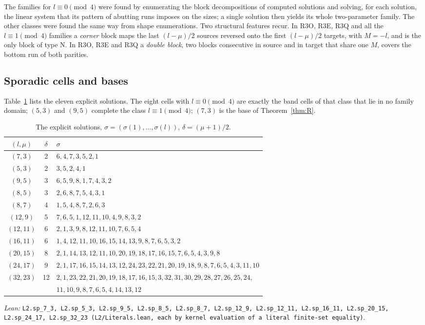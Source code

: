 \documentclass[11pt]{amsart}
\theoremstyle{plain}
\theoremstyle{definition}
\theoremstyle{remark}
\newcommand{\lean}[1]{\par\smallskip
  {\small\raggedright\noindent\textit{Lean:} \texttt{#1}.\par}\smallskip}
\begin{document}
The families for $l \equiv 0 \pmod 4$ were found by enumerating the block
decompositions of computed solutions and solving, for each solution, the linear system
that its pattern of abutting runs imposes on the sizes; a single solution then yields its
whole two-parameter family. The other classes were found the same way from shape
enumerations. Two structural features recur. In R3O, R3E, R3Q and all the
$l \equiv 1 \pmod 4$ families a \emph{corner} block maps the last $(l-\mu)/2$ sources
reversed onto the first $(l-\mu)/2$ targets, with $M = -l$, and is the only block of
type N. In R3O, R3E and R3Q a \emph{double block}, two blocks consecutive in source and
in target that share one $M$, covers the bottom run of both parities.

\subsection*{Sporadic cells and bases}
Table~\ref{tab:sporadic} lists the eleven explicit solutions. The eight cells with
$l \equiv 0 \pmod 4$ are exactly the band cells of that class that lie in no family
domain; $(5,3)$ and $(9,5)$ complete the class $l \equiv 1 \pmod 4$; $(7,3)$ is the base
of Theorem~\ref{thm:R}.

\begin{table}[ht]
\centering\small
\caption{The explicit solutions, $\sigma = (\sigma(1),\dots,\sigma(l))$, $\delta = (\mu+1)/2$.}
\label{tab:sporadic}
\begin{tabular}{@{}ccl@{}}
\toprule
$(l,\mu)$ & $\delta$ & $\sigma$ \\
\midrule
$(7,3)$ & 2 & $6,4,7,3,5,2,1$ \\
$(5,3)$ & 2 & $3,5,2,4,1$ \\
$(9,5)$ & 3 & $6,5,9,8,1,7,4,3,2$ \\
$(8,5)$ & 3 & $2,6,8,7,5,4,3,1$ \\
$(8,7)$ & 4 & $1,5,4,8,7,2,6,3$ \\
$(12,9)$ & 5 & $7,6,5,1,12,11,10,4,9,8,3,2$ \\
$(12,11)$ & 6 & $2,1,3,9,8,12,11,10,7,6,5,4$ \\
$(16,11)$ & 6 & $1,4,12,11,10,16,15,14,13,9,8,7,6,5,3,2$ \\
$(20,15)$ & 8 & $2,1,14,13,12,11,10,20,19,18,17,16,15,7,6,5,4,3,9,8$ \\
$(24,17)$ & 9 & $2,1,17,16,15,14,13,12,24,23,22,21,20,19,18,9,8,7,6,5,4,3,11,10$ \\
$(32,23)$ & 12 & $2,1,23,22,21,20,19,18,17,16,15,3,32,31,30,29,28,27,26,25,24,$\\
 & & $11,10,9,8,7,6,5,4,14,13,12$ \\
\bottomrule
\end{tabular}
\end{table}
\lean{L2.sp\_7\_3, L2.sp\_5\_3, L2.sp\_9\_5, L2.sp\_8\_5, L2.sp\_8\_7, L2.sp\_12\_9,
L2.sp\_12\_11, L2.sp\_16\_11, L2.sp\_20\_15, L2.sp\_24\_17, L2.sp\_32\_23
(L2/Literals.lean, each by kernel evaluation of a literal finite-set equality)}
\end{document}
